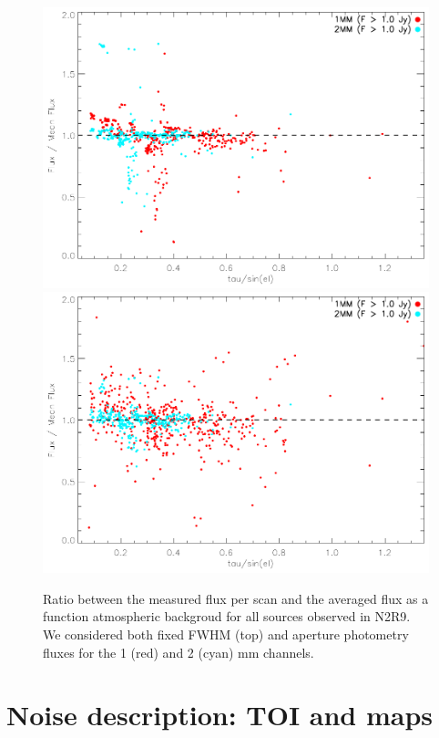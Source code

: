 \documentclass[a4paper, 11pt]{article} %
\begin{document}
\begin{figure}
\begin{center}
\includegraphics[clip, angle=0, scale = 0.7]{Figures/FluxIndScans/flux_ratio_rz_run22.pdf}
\includegraphics[clip, angle=0, scale = 0.7]{Figures/FluxIndScans/flux_ap_ratio_rz_run22.pdf}
\caption{Ratio between the measured flux per scan and the averaged flux as a function atmospheric backgroud for all sources observed in N2R9. We considered both fixed FWHM (top) and aperture photometry fluxes for the 1 (red) and 2 (cyan) mm channels. }
\label{fig:fluxvsbackground}
\end{center}
\end{figure}

\section{Noise description: TOI and maps}
\end{document}
